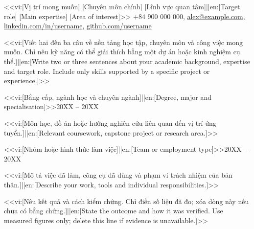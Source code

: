 \documentclass[a4paper,11pt]{article}
\begin{document}
  {<<vi:[Vị trí mong muốn] \textbar{} [Chuyên môn chính] \textbar{} [Lĩnh vực quan tâm]||en:[Target role] \textbar{} [Main expertise] \textbar{} [Area of interest]>>}
  {+84 900 000 000, \href{mailto:alex@example.com}{alex@example.com},
   \href{https://linkedin.com/in/username}{linkedin.com/in/username},
   \href{https://github.com/username}{github.com/username}}

{\small <<vi:[Viết hai đến ba câu về nền tảng học tập, chuyên môn và công việc mong muốn. Chỉ nêu kỹ năng có thể giải thích bằng một dự án hoặc kinh nghiệm cụ thể.]||en:[Write two or three sentences about your academic background, expertise and target role. Include only skills supported by a specific project or experience.]>>}

        {<<vi:[Bằng cấp, ngành học và chuyên ngành]||en:[Degree, major and specialisation]>>}{20XX -- 20XX}
\begin{cvitems}
  \item {}<<vi:[Môn học, đồ án hoặc hướng nghiên cứu liên quan đến vị trí ứng tuyển.]||en:[Relevant coursework, capstone project or research area.]>>
\end{cvitems}

        {<<vi:[Nhóm hoặc hình thức làm việc]||en:[Team or employment type]>>}{20XX -- 20XX}
\begin{cvitems}
  \item {}<<vi:[Mô tả việc đã làm, công cụ đã dùng và phạm vi trách nhiệm của bản thân.]||en:[Describe your work, tools and individual responsibilities.]>>
  \item {}<<vi:[Nêu kết quả và cách kiểm chứng. Chỉ điền số liệu đã đo; xóa dòng này nếu chưa có bằng chứng.]||en:[State the outcome and how it was verified. Use measured figures only; delete this line if evidence is unavailable.]>>
\end{cvitems}
\end{document}
